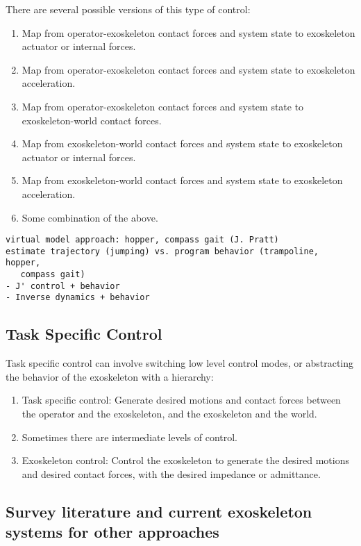 \documentclass[letterpaper,12pt,fullpage]{article}
\begin{document}
There are several possible versions of this type of control:
\begin{enumerate}
\item
Map from operator-exoskeleton contact forces and system state
to exoskeleton actuator or internal forces.
\item
Map from operator-exoskeleton contact forces and system state
to exoskeleton acceleration.
\item
Map from operator-exoskeleton contact forces and system state
to exoskeleton-world contact forces.
\item
Map from exoskeleton-world contact forces and system state to exoskeleton actuator or internal forces.
\item
Map from exoskeleton-world contact forces and system state to exoskeleton acceleration.
\item
Some combination of the above.
\end{enumerate}

\begin{verbatim}
virtual model approach: hopper, compass gait (J. Pratt)
estimate trajectory (jumping) vs. program behavior (trampoline, hopper,
   compass gait)
- J' control + behavior
- Inverse dynamics + behavior
\end{verbatim}

\subsection{Task Specific Control}

Task specific control can involve switching low level control modes, or abstracting
the behavior of the exoskeleton with a hierarchy:
\begin{enumerate}
\item
Task specific control: Generate desired motions and contact forces between
the operator and the exoskeleton, and the exoskeleton and the world.
\item
Sometimes there are intermediate levels of control.
\item
Exoskeleton control: Control the exoskeleton to generate the desired motions and
desired contact forces, with the desired impedance or admittance.
\end{enumerate}

\subsection{Survey literature and current exoskeleton systems for other approaches}
\end{document}
